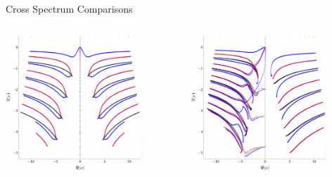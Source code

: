\documentclass[aspectratio=169, xcolor=dvipsnames]{beamer}
\begin{document}
\begin{frame}{Cross Spectrum Comparisons}
  \begin{columns}[T]
    \begin{column}{0.5\textwidth}
      \includegraphics[width=0.8\textwidth]{figs/all_sectors_compared_ef_spherical_over_a0.pdf}
    \end{column}

    \begin{column}{0.5\textwidth}
      \includegraphics[width=0.8\textwidth]{figs/all_sectors_compared_ef_spherical_over_a1_2.pdf}
    \end{column}
  \end{columns}


\end{frame}
\end{document}
